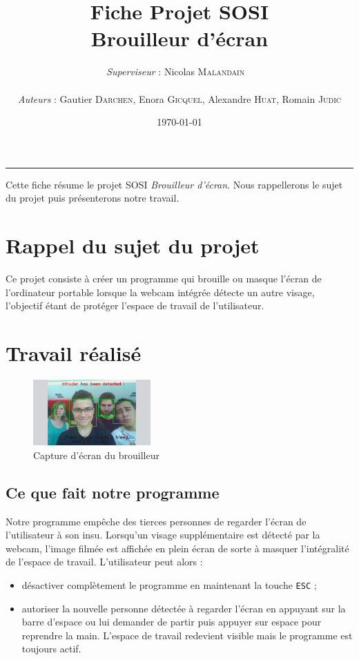 \documentclass[11pt]{article}
\title{Fiche Projet SOSI\\\huge{Brouilleur d'écran}}
\author{\emph{Superviseur} : Nicolas \textsc{Malandain} ~\\\\ \emph{Auteurs} : Gautier \textsc{Darchen}, Enora \textsc{Gicquel}, Alexandre \textsc{Huat}, Romain \textsc{Judic}}
\date{\today}
\begin{document}
\maketitle
\noindent\rule{\textwidth}{1.3pt}

Cette fiche résume le projet SOSI \emph{Brouilleur d'écran}. Nous rappellerons le sujet du projet puis présenterons notre travail.

\section{Rappel du sujet du projet}
Ce projet consiste à créer un programme qui brouille ou masque l'écran de l'ordinateur portable lorsque la webcam intégrée détecte un autre visage, l'objectif étant de protéger l'espace de travail de l'utilisateur.

\section{Travail réalisé}

\begin{figure}[H]
\begin{center}
\includegraphics[width=0.4\textwidth]{capture.png}
\caption{Capture d'écran du brouilleur}
\end{center}
\end{figure}

\subsection{Ce que fait notre programme}
Notre programme empêche des tierces personnes de regarder l'écran de l'utilisateur à son insu. Lorsqu'un visage supplémentaire est détecté par la webcam, l'image filmée est affichée en plein écran de sorte à masquer l'intégralité de l'espace de travail. L'utilisateur peut alors :
\begin{itemize}
\item désactiver complètement le programme en maintenant la touche \texttt{ESC} ;
\item autoriser la nouvelle personne détectée à regarder l'écran en appuyant sur la barre d'espace ou lui demander de partir puis appuyer sur espace pour reprendre la main. L'espace de travail redevient visible mais le programme est toujours actif.
\end{itemize}
\end{document}
